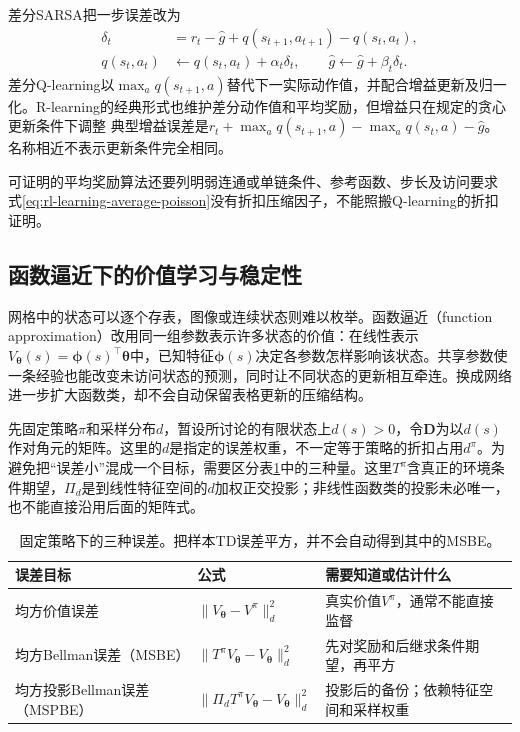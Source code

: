 差分SARSA把一步误差改为
\[
  \begin{aligned}
    \delta_t&=r_t-\widehat g+q(s_{t+1},a_{t+1})-q(s_t,a_t),\\
    q(s_t,a_t)&\leftarrow q(s_t,a_t)+\alpha_t\delta_t,\qquad
    \widehat g\leftarrow\widehat g+\beta_t\delta_t .
  \end{aligned}
\]
差分Q-learning以$\max_a q(s_{t+1},a)$替代下一实际动作值，并配合增益更新及归一化。R-learning的经典形式也维护差分动作值和平均奖励，但增益只在规定的贪心更新条件下调整
典型增益误差是$r_t+\max_aq(s_{t+1},a)-\max_aq(s_t,a)-\widehat g$。名称相近不表示更新条件完全相同。

可证明的平均奖励算法还要列明弱连通或单链条件、参考函数、步长及访问要求
式\eqref{eq:rl-learning-average-poisson}没有折扣压缩因子，不能照搬Q-learning的折扣证明。

\subsection{函数逼近下的价值学习与稳定性}
\label{sec:rl-learning-approximation}

网格中的状态可以逐个存表，图像或连续状态则难以枚举。函数逼近（function approximation）改用同一组参数表示许多状态的价值：在线性表示$V_{\bm{\theta}}(s)=\bm{\phi}(s)^\top\bm{\theta}$中，已知特征$\bm\phi(s)$决定各参数怎样影响该状态。共享参数使一条经验也能改变未访问状态的预测，同时让不同状态的更新相互牵连。换成网络进一步扩大函数类，却不会自动保留表格更新的压缩结构。

先固定策略$\pi$和采样分布$d$，暂设所讨论的有限状态上$d(s)>0$，令$\bm{D}$为以$d(s)$作对角元的矩阵。这里的$d$是指定的误差权重，不一定等于策略的折扣占用$d^\pi$。为避免把“误差小”混成一个目标，需要区分表\ref{tab:rl-learning-value-objectives}中的三种量。这里$T^\pi$含真正的环境条件期望，$\Pi_d$是到线性特征空间的$d$加权正交投影；非线性函数类的投影未必唯一，也不能直接沿用后面的矩阵式。

\begin{table}[t]
  \centering
  \small
  \begin{tabularx}{\linewidth}{>{\raggedright\arraybackslash}p{30mm} >{\raggedright\arraybackslash}X >{\raggedright\arraybackslash}X}
    \toprule
    误差目标 & 公式 & 需要知道或估计什么 \\
    \midrule
    均方价值误差 & $\lVert V_{\bm{\theta}}-V^\pi\rVert_d^2$ & 真实价值$V^\pi$，通常不能直接监督 \\
    均方Bellman误差（MSBE） & $\lVert T^\pi V_{\bm{\theta}}-V_{\bm{\theta}}\rVert_d^2$ & 先对奖励和后继求条件期望，再平方 \\
    均方投影Bellman误差（MSPBE） & $\lVert\Pi_dT^\pi V_{\bm{\theta}}-V_{\bm{\theta}}\rVert_d^2$ & 投影后的备份；依赖特征空间和采样权重 \\
    \bottomrule
  \end{tabularx}
  \caption{固定策略下的三种误差。把样本TD误差平方，并不会自动得到其中的MSBE。}
  \label{tab:rl-learning-value-objectives}
\end{table}

